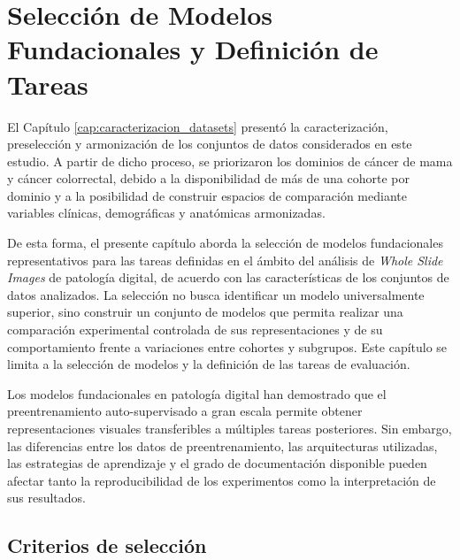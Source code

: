 \chapter{Selección de Modelos Fundacionales y Definición de Tareas}
\label{cap:seleccion_modelos}

El Capítulo \ref{cap:caracterizacion_datasets} presentó la caracterización, preselección y armonización de los conjuntos de datos considerados en este estudio. A partir de dicho proceso, se priorizaron los dominios de cáncer de mama y cáncer colorrectal, debido a la disponibilidad de más de una cohorte por dominio y a la posibilidad de construir espacios de comparación mediante variables clínicas, demográficas y anatómicas armonizadas.

De esta forma, el presente capítulo aborda la selección de modelos fundacionales representativos para las tareas definidas en el ámbito del análisis de \textit{Whole Slide Images} de patología digital, de acuerdo con las características de los conjuntos de datos analizados. La selección no busca identificar un modelo universalmente superior, sino construir un conjunto de modelos que permita realizar una comparación experimental controlada de sus representaciones y de su comportamiento frente a variaciones entre cohortes y subgrupos. Este capítulo se limita a la selección de modelos y la definición de las tareas de evaluación.

Los modelos fundacionales en patología digital han demostrado que el preentrenamiento auto-supervisado a gran escala permite obtener representaciones visuales transferibles a múltiples tareas posteriores. Sin embargo, las diferencias entre los datos de preentrenamiento, las arquitecturas utilizadas, las estrategias de aprendizaje y el grado de documentación disponible pueden afectar tanto la reproducibilidad de los experimentos como la interpretación de sus resultados.

\section{Criterios de selección}
\label{sec:criterios_seleccion}


